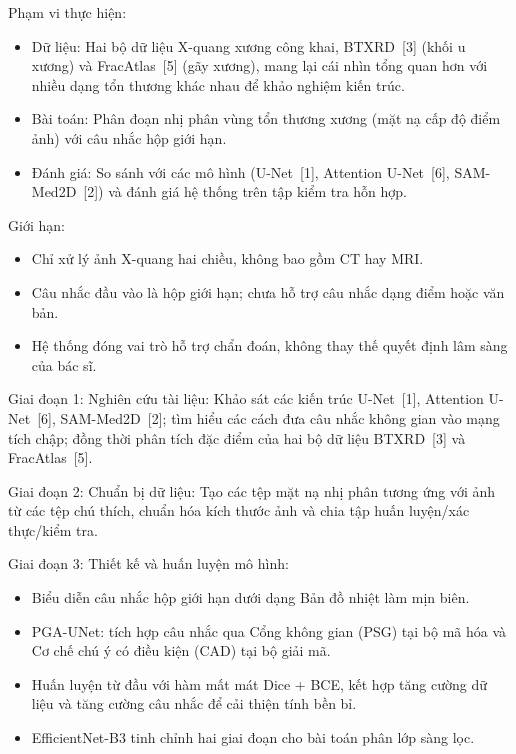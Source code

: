 \medskip
{}

\medskip
Phạm vi thực hiện:
\begin{itemize}
    \item Dữ liệu: Hai bộ dữ liệu X-quang xương công khai, BTXRD~[3] (khối u xương) và FracAtlas~[5] (gãy xương), mang lại cái nhìn tổng quan hơn với nhiều dạng tổn thương khác nhau để khảo nghiệm kiến trúc.
    \item Bài toán: Phân đoạn nhị phân vùng tổn thương xương (mặt nạ cấp độ điểm ảnh) với câu nhắc hộp giới hạn.
    \item Đánh giá: So sánh với các mô hình (U-Net~[1], Attention U-Net~[6], SAM-Med2D~[2]) và đánh giá hệ thống trên tập kiểm tra hỗn hợp.
\end{itemize}

Giới hạn:
\begin{itemize}
    \item Chỉ xử lý ảnh X-quang hai chiều, không bao gồm CT hay MRI.
    \item Câu nhắc đầu vào là hộp giới hạn; chưa hỗ trợ câu nhắc dạng điểm hoặc văn bản.
    \item Hệ thống đóng vai trò hỗ trợ chẩn đoán, không thay thế quyết định lâm sàng của bác sĩ.
\end{itemize}

\medskip
{}

\medskip
Giai đoạn 1: Nghiên cứu tài liệu: Khảo sát các kiến trúc U-Net~[1], Attention U-Net~[6], SAM-Med2D~[2]; tìm hiểu các cách đưa câu nhắc không gian vào mạng tích chập; đồng thời phân tích đặc điểm của hai bộ dữ liệu BTXRD~[3] và FracAtlas~[5].

Giai đoạn 2: Chuẩn bị dữ liệu: Tạo các tệp mặt nạ nhị phân tương ứng với ảnh từ các tệp chú thích, chuẩn hóa kích thước ảnh và chia tập huấn luyện/xác thực/kiểm tra.

Giai đoạn 3: Thiết kế và huấn luyện mô hình:
\begin{itemize}
    \item Biểu diễn câu nhắc hộp giới hạn dưới dạng Bản đồ nhiệt làm mịn biên.
    \item PGA-UNet: tích hợp câu nhắc qua Cổng không gian (PSG) tại bộ mã hóa và Cơ chế chú ý có điều kiện (CAD) tại bộ giải mã.
    \item Huấn luyện từ đầu với hàm mất mát Dice + BCE, kết hợp tăng cường dữ liệu và tăng cường câu nhắc để cải thiện tính bền bỉ.
    \item EfficientNet-B3 tinh chỉnh hai giai đoạn cho bài toán phân lớp sàng lọc.
\end{itemize}

